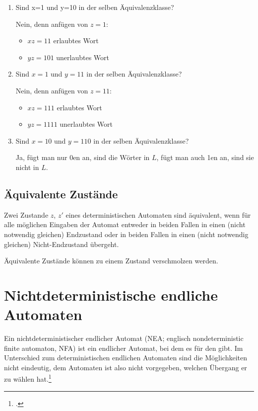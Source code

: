 \documentclass{lehramt-informatik-haupt}
\begin{document}
\begin{enumerate}
\item Sind x=1 und y=10 in der selben Äquivalenzklasse?

Nein, denn anfügen von $z=1$:

\begin{itemize}
\item $xz = 11$ erlaubtes Wort

\item $yz = 101$ unerlaubtes Wort
\end{itemize}

\item Sind $x=1$ und $y=11$ in der selben Äquivalenzklasse?

Nein, denn anfügen von $z=11$:

\begin{itemize}
\item $xz = 111$ erlaubtes Wort
\item $yz = 1111$ unerlaubtes Wort
\end{itemize}

\item Sind $x=10$ und $y=110$ in der selben Äquivalenzklasse?

Ja, fügt man nur 0en an, sind die Wörter in $L$, fügt man auch 1en an,
sind sie nicht in $L$.
\end{enumerate}

\subsection{Äquivalente Zustände}

Zwei Zustande $z$, $z'$ eines deterministischen Automaten sind
äquivalent, wenn für alle möglichen Eingaben der Automat entweder in
beiden Fallen in einen (nicht notwendig gleichen) Endzustand oder in
beiden Fallen in einen (nicht notwendig gleichen) Nicht-Endzustand
übergeht.

Äquivalente Zustände können zu einem Zustand verschmolzen
werden.

%

\section{Nichtdeterministische endliche Automaten}

Ein nichtdeterministischer endlicher Automat (NEA; englisch
nondeterministic finite automaton, NFA) ist ein endlicher Automat, bei
dem es für den  gibt. Im Unterschied zum deterministischen endlichen
Automaten sind die Möglichkeiten nicht eindeutig, dem Automaten ist also
nicht vorgegeben, welchen Übergang er zu wählen hat.\footcite{wiki:nea}
\end{document}
